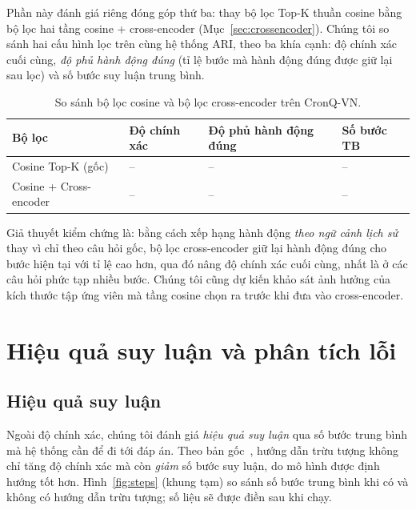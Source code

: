Phần này đánh giá riêng đóng góp thứ ba: thay bộ lọc Top-K thuần cosine bằng bộ lọc hai tầng
cosine + cross-encoder (Mục~\ref{sec:crossencoder}). Chúng tôi so sánh hai cấu hình lọc trên cùng hệ
thống ARI, theo ba khía cạnh: độ chính xác cuối cùng, \emph{độ phủ hành động đúng} (tỉ lệ bước mà
hành động đúng được giữ lại sau lọc) và số bước suy luận trung bình.

\begin{table}[ht]
\centering
\caption{So sánh bộ lọc cosine và bộ lọc cross-encoder trên CronQ-VN.}
\label{tab:ce}
\begin{tabular}{L{5.0cm} C{2.6cm} C{2.6cm} C{2.6cm}}
\toprule
\textbf{Bộ lọc} & \textbf{Độ chính xác} & \textbf{Độ phủ hành động đúng} & \textbf{Số bước TB} \\
\midrule
Cosine Top-K (gốc) & -- & -- & -- \\
Cosine + Cross-encoder & -- & -- & -- \\
\bottomrule
\end{tabular}
\end{table}

\noindent{}

Giả thuyết kiểm chứng là: bằng cách xếp hạng hành động \emph{theo ngữ cảnh lịch sử} thay vì chỉ theo
câu hỏi gốc, bộ lọc cross-encoder giữ lại hành động đúng cho bước hiện tại với tỉ lệ cao hơn, qua đó
nâng độ chính xác cuối cùng, nhất là ở các câu hỏi phức tạp nhiều bước. Chúng tôi cũng dự kiến khảo
sát ảnh hưởng của kích thước tập ứng viên mà tầng cosine chọn ra trước khi đưa vào cross-encoder.

\section{Hiệu quả suy luận và phân tích lỗi}
\label{sec:error-analysis}

\subsection{Hiệu quả suy luận}

Ngoài độ chính xác, chúng tôi đánh giá \emph{hiệu quả suy luận} qua số bước trung bình mà hệ thống
cần để đi tới đáp án. Theo bản gốc~\cite{chen2024ari}, hướng dẫn trừu tượng không chỉ tăng độ chính
xác mà còn \emph{giảm} số bước suy luận, do mô hình được định hướng tốt hơn. Hình~\ref{fig:steps}
(khung tạm) so sánh số bước trung bình khi có và không có hướng dẫn trừu tượng; số liệu sẽ được điền
sau khi chạy.

